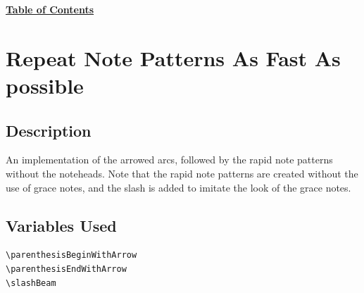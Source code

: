 \hyperref[sec:toc]{\textbf{Table of Contents}}

\vfill \break


\section {Repeat Note Patterns As Fast As possible}
\label{sec:repeat_notepatterns_afap}
\hfill
{}
\hfill

\subsection{Description}
An implementation of the arrowed arcs, followed by the rapid note patterns without the noteheads. Note that the rapid note patterns are created without the use of grace notes, and the slash is added to imitate the look of the grace notes.

\subsection{Variables Used}
\begin{verbatim}
\parenthesisBeginWithArrow
\parenthesisEndWithArrow
\slashBeam

\end{verbatim}
